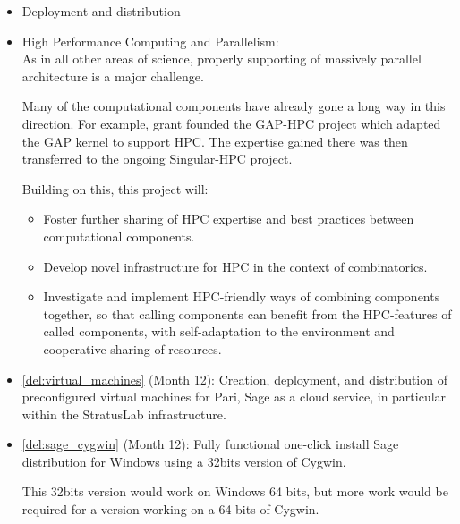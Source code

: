 \begin{Workpackage}{\thewpno}
\begin{WPDescription}
\begin{itemize}
  \item Deployment and distribution
  \item High Performance Computing and Parallelism:\\
    As in all other areas of science, properly supporting of massively
    parallel architecture is a major challenge.

    Many of the computational components have already gone a long way
    in this direction. For example, grant  founded the
    GAP-HPC project which adapted the GAP kernel to support HPC. The
    expertise gained there was then transferred to the ongoing
    Singular-HPC project.

    Building on this, this project will:
    \begin{itemize}
    \item Foster further sharing of HPC expertise and best practices
      between computational components.
    \item Develop novel infrastructure for HPC in the context of
      combinatorics.
    \item Investigate and implement HPC-friendly ways of combining
      components together, so that calling components can benefit from
      the HPC-features of called components, with self-adaptation to
      the environment and cooperative sharing of resources.
    \end{itemize}
  \end{itemize}
\end{WPDescription}

\begin{WPDeliverables}
\begin{itemize}
\item \ref{del:virtual_machines} (Month 12): Creation, deployment, and
  distribution of preconfigured virtual machines for Pari, Sage as a
  cloud service, in particular within the StratusLab infrastructure.
\item \ref{del:sage_cygwin} (Month 12): Fully functional one-click
  install Sage distribution for Windows using a 32bits version of Cygwin.

  This 32bits version would work on Windows 64 bits, but more work
  would be required for a version working on a 64 bits of Cygwin.


\end{itemize}
\end{WPDeliverables}
\end{Workpackage}
